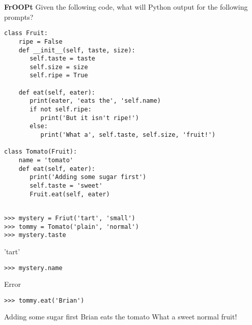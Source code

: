 \begin{blocksection}
\question \textbf{FrOOPt} \newline
Given the following code, what will Python output for the following prompts? 

\begin{lstlisting}
class Fruit:
    ripe = False
    def __init__(self, taste, size):
       self.taste = taste
       self.size = size
       self.ripe = True
    
    def eat(self, eater):
       print(eater, 'eats the', 'self.name)
       if not self.ripe:
          print('But it isn't ripe!')
       else:
          print('What a', self.taste, self.size, 'fruit!')

class Tomato(Fruit):
    name = 'tomato'
    def eat(self, eater):  
       print('Adding some sugar first')
       self.taste = 'sweet'
       Fruit.eat(self, eater) 
       
\end{lstlisting}
\end{blocksection}
\newline
\newline
\newline
\begin{blocksection}

\begin{lstlisting}
>>> mystery = Friut('tart', 'small')
>>> tommy = Tomato('plain', 'normal')
>>> mystery.taste
\end{lstlisting}
\begin{solution}[.2in]
'tart'
\end{solution}

\begin{lstlisting}
>>> mystery.name
\end{lstlisting}
\begin{solution}[.2in]
Error
\end{solution}

\begin{lstlisting}
>>> tommy.eat('Brian')
\end{lstlisting}
\begin{solution}[.2in]
Adding some sugar first \newline
Brian eats the tomato \newline
What a sweet normal fruit!
\end{solution}
\end{blocksection}

